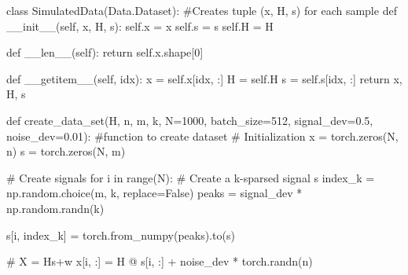 \documentclass[
  letterpaper,
  DIV=11,
  numbers=noendperiod]{scrartcl}
\newenvironment{Shaded}{\begin{snugshade}}{\end{snugshade}}
\newcommand{\BuiltInTok}[1]{\textcolor[rgb]{0.40,0.85,0.94}{#1}}
\newcommand{\CommentTok}[1]{\textcolor[rgb]{0.46,0.44,0.37}{#1}}
\newcommand{\ControlFlowTok}[1]{\textcolor[rgb]{0.98,0.15,0.45}{#1}}
\newcommand{\DecValTok}[1]{\textcolor[rgb]{0.68,0.51,1.00}{#1}}
\newcommand{\FloatTok}[1]{\textcolor[rgb]{0.68,0.51,1.00}{#1}}
\newcommand{\FunctionTok}[1]{\textcolor[rgb]{0.65,0.89,0.18}{#1}}
\newcommand{\KeywordTok}[1]{\textcolor[rgb]{0.98,0.15,0.45}{#1}}
\newcommand{\NormalTok}[1]{\textcolor[rgb]{0.97,0.97,0.95}{#1}}
\newcommand{\OperatorTok}[1]{\textcolor[rgb]{0.97,0.97,0.95}{#1}}
\newcommand{\VariableTok}[1]{\textcolor[rgb]{0.97,0.97,0.95}{#1}}
\begin{document}
\begin{Shaded}
\begin{Highlighting}[]
\KeywordTok{class}\NormalTok{ SimulatedData(Data.Dataset): }\CommentTok{\#Creates tuple (x, H, s) for each sample}
    \KeywordTok{def} \FunctionTok{\_\_init\_\_}\NormalTok{(}\VariableTok{self}\NormalTok{, x, H, s):}
        \VariableTok{self}\NormalTok{.x }\OperatorTok{=}\NormalTok{ x}
        \VariableTok{self}\NormalTok{.s }\OperatorTok{=}\NormalTok{ s}
        \VariableTok{self}\NormalTok{.H }\OperatorTok{=}\NormalTok{ H}

    \KeywordTok{def} \FunctionTok{\_\_len\_\_}\NormalTok{(}\VariableTok{self}\NormalTok{):}
        \ControlFlowTok{return} \VariableTok{self}\NormalTok{.x.shape[}\DecValTok{0}\NormalTok{]}

    \KeywordTok{def} \FunctionTok{\_\_getitem\_\_}\NormalTok{(}\VariableTok{self}\NormalTok{, idx):}
\NormalTok{        x }\OperatorTok{=} \VariableTok{self}\NormalTok{.x[idx, :]}
\NormalTok{        H }\OperatorTok{=} \VariableTok{self}\NormalTok{.H}
\NormalTok{        s }\OperatorTok{=} \VariableTok{self}\NormalTok{.s[idx, :]}
        \ControlFlowTok{return}\NormalTok{ x, H, s}

\KeywordTok{def}\NormalTok{ create\_data\_set(H, n, m, k, N}\OperatorTok{=}\DecValTok{1000}\NormalTok{, batch\_size}\OperatorTok{=}\DecValTok{512}\NormalTok{, signal\_dev}\OperatorTok{=}\FloatTok{0.5}\NormalTok{, noise\_dev}\OperatorTok{=}\FloatTok{0.01}\NormalTok{): }\CommentTok{\#function to create dataset}
    \CommentTok{\# Initialization}
\NormalTok{    x }\OperatorTok{=}\NormalTok{ torch.zeros(N, n)}
\NormalTok{    s }\OperatorTok{=}\NormalTok{ torch.zeros(N, m)}

    \CommentTok{\# Create signals}
    \ControlFlowTok{for}\NormalTok{ i }\KeywordTok{in} \BuiltInTok{range}\NormalTok{(N):}
        \CommentTok{\# Create a k{-}sparsed signal s}
\NormalTok{        index\_k }\OperatorTok{=}\NormalTok{ np.random.choice(m, k, replace}\OperatorTok{=}\VariableTok{False}\NormalTok{)}
\NormalTok{        peaks }\OperatorTok{=}\NormalTok{ signal\_dev }\OperatorTok{*}\NormalTok{ np.random.randn(k)}

\NormalTok{        s[i, index\_k] }\OperatorTok{=}\NormalTok{ torch.from\_numpy(peaks).to(s)}

        \CommentTok{\# X = Hs+w}
\NormalTok{        x[i, :] }\OperatorTok{=}\NormalTok{ H }\OperatorTok{@}\NormalTok{ s[i, :] }\OperatorTok{+}\NormalTok{ noise\_dev }\OperatorTok{*}\NormalTok{ torch.randn(n)}


\end{Highlighting}
\end{Shaded}
\end{document}

